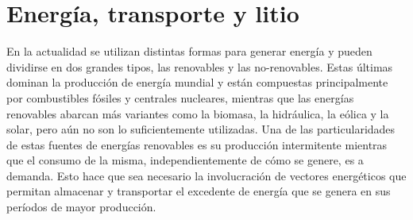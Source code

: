\section{Energía, transporte y litio}

En la actualidad se utilizan distintas formas para generar energía y pueden 
dividirse en dos grandes tipos, las renovables y las no-renovables. Estas últimas
dominan la producción de energía mundial y están compuestas principalmente por 
combustibles fósiles y centrales nucleares, mientras que las energías renovables
abarcan más variantes como la biomasa, la hidráulica, la eólica y la solar, pero 
aún no son lo suficientemente utilizadas. Una de las particularidades de estas 
fuentes de energías renovables es su producción intermitente mientras que el 
consumo de la misma, independientemente de cómo se genere, es a demanda. Esto 
hace que sea necesario la involucración de vectores energéticos que permitan 
almacenar y transportar el excedente de energía que se genera en sus períodos de 
mayor producción.

